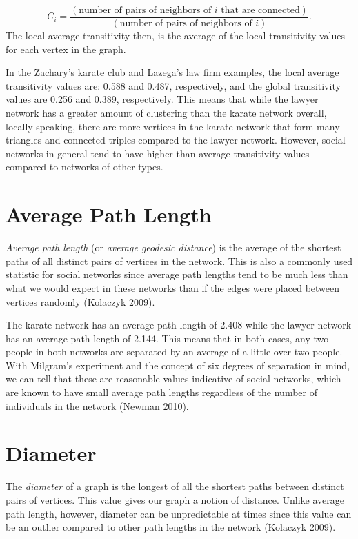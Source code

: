 \documentclass[12pt,twoside]{amherstthesis}
\begin{document}
  \[ C_{i} = \frac {(\text{number of pairs of neighbors of } i \text{ that are connected})} {(\text{number of pairs of neighbors of } i)}.\]
  The local average transitivity then, is the average of the local
  transitivity values for each vertex in the graph.
  
  In the Zachary's karate club and Lazega's law firm examples, the local
  average transitivity values are: 0.588 and 0.487, respectively, and the
  global transitivity values are 0.256 and 0.389, respectively. This means
  that while the lawyer network has a greater amount of clustering than
  the karate network overall, locally speaking, there are more vertices in
  the karate network that form many triangles and connected triples
  compared to the lawyer network. However, social networks in general tend
  to have higher-than-average transitivity values compared to networks of
  other types.
  
  \section{Average Path Length}\label{average-path-length}
  
  \emph{Average path length} (or \emph{average geodesic distance}) is the
  average of the shortest paths of all distinct pairs of vertices in the
  network. This is also a commonly used statistic for social networks
  since average path lengths tend to be much less than what we would
  expect in these networks than if the edges were placed between vertices
  randomly (Kolaczyk 2009).
  
  The karate network has an average path length of 2.408 while the lawyer
  network has an average path length of 2.144. This means that in both
  cases, any two people in both networks are separated by an average of a
  little over two people. With Milgram's experiment and the concept of six
  degrees of separation in mind, we can tell that these are reasonable
  values indicative of social networks, which are known to have small
  average path lengths regardless of the number of individuals in the
  network (Newman 2010).
  
  \section{Diameter}\label{diameter}
  
  The \emph{diameter} of a graph is the longest of all the shortest paths
  between distinct pairs of vertices. This value gives our graph a notion
  of distance. Unlike average path length, however, diameter can be
  unpredictable at times since this value can be an outlier compared to
  other path lengths in the network (Kolaczyk 2009).
  
\end{document}
